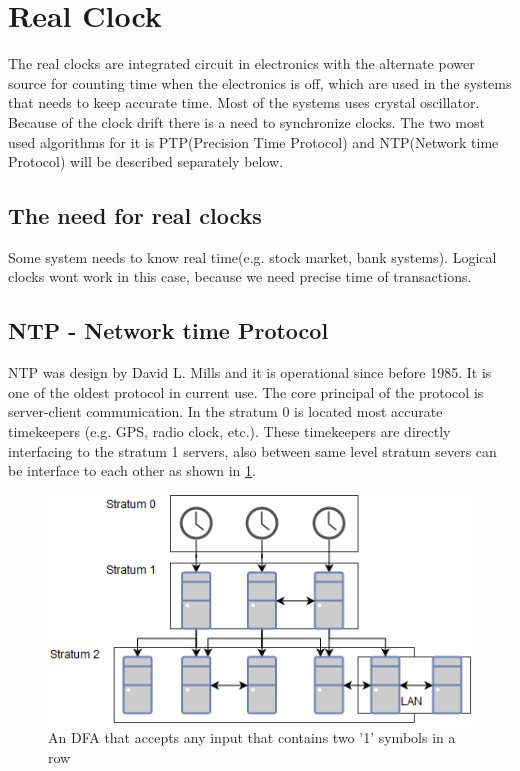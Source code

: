 \section{Real Clock}\label{sc:realClock}
The real clocks are integrated circuit in electronics with the alternate power source for counting time when the electronics is off, which are used in the systems that needs to keep accurate time. Most of the systems uses crystal oscillator. Because of the clock drift there is a need to synchronize clocks. The two most used algorithms for it is PTP(Precision Time Protocol) and NTP(Network time Protocol) will be described separately below.

\subsection{The need for real clocks}
Some system needs to know real time(e.g. stock market, bank systems). Logical clocks wont work in this case, because we need precise time of transactions.

\subsection{NTP - Network time Protocol}
NTP was design by David L. Mills and it is operational since before 1985. It is one of the oldest protocol in
current use. The core principal of the protocol is server-client communication. In the stratum 0 is located
most accurate timekeepers (e.g. GPS, radio clock, etc.). These timekeepers are directly interfacing to the
stratum 1 servers, also between same level stratum severs can be interface to each other as shown in \ref{fig:NTP}.

\begin{figure}[H]\label{}
	\centering
	\includegraphics[scale=0.4]{synchronization/fig/NTP.png}
	\caption{An DFA that accepts any input that contains two '1' symbols in a row}
	\label{fig:NTP}
\end{figure}

